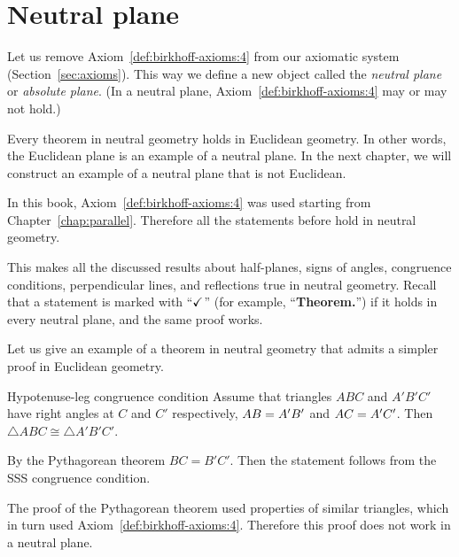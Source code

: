 
\chapter{Neutral plane}\label{chap:non-euclid}

Let us remove Axiom~\ref{def:birkhoff-axioms:4} from our axiomatic system (Section~\ref{sec:axioms}).
This way we define a new object called the 
\emph{neutral plane} or \emph{absolute plane}.
(In a neutral plane, Axiom~\ref{def:birkhoff-axioms:4} may or may not hold.)

Every theorem in neutral geometry holds in Euclidean geometry.
In other words, the Euclidean plane is an example of a neutral plane. 
In the next chapter, we will construct an example of a neutral plane that is not Euclidean.

In this book, 
Axiom~\ref{def:birkhoff-axioms:4} was used starting from Chapter~\ref{chap:parallel}.
Therefore all the statements before hold in neutral geometry.

This makes all the discussed results
about
half-planes,
signs of angles,
congruence conditions,
perpendicular lines,
and reflections 
true in neutral geometry.
Recall that a statement is marked with ``$\checkmark$''\label{a-mark} (for example, ``\textbf{Theorem.\abs}'') if it holds in every neutral plane, and the same proof works.


Let us give an example of a theorem in neutral geometry that admits a simpler proof in Euclidean geometry. 

\begin{thm}{Hypotenuse-leg congruence condition}\label{thm:hypotenuse-leg}
Assume that triangles $ABC$ and $A'B'C'$
have right angles at $C$ and $C'$ respectively, 
$AB=A'B'$ and $AC=A'C'$.
Then $\triangle ABC\cong\triangle A'B'C'$.
\end{thm}


By the Pythagorean theorem $BC=B'C'$.
Then the statement follows from the SSS congruence condition.
\qeds

The proof of the Pythagorean theorem used properties of similar triangles, which in turn used Axiom~\ref{def:birkhoff-axioms:4}. 
Therefore this proof does not work in a neutral plane.

